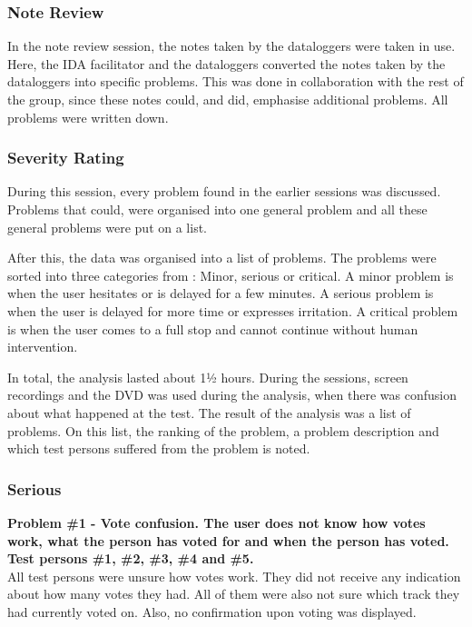 \subsubsection{Note Review}
In the note review session, the notes taken by the dataloggers were
taken in use. Here, the IDA facilitator and the dataloggers converted
the notes taken by the dataloggers into specific problems. This was
done in collaboration with the rest of the group, since these notes
could, and did, emphasise additional problems. All problems were written down.

\subsubsection{Severity Rating}
During this session, every problem found in the earlier sessions was
discussed. Problems that could, were organised into one general problem and all these general problems were put on a list.

After this, the data was organised into a list of problems. The
problems were sorted into three categories from
: Minor, serious or critical.
A minor problem is when the user hesitates or is delayed for a few
minutes. A serious problem is when the user is delayed for more time
or expresses irritation. A critical problem is when the user comes to a full stop and cannot continue without human intervention.

In total, the analysis lasted about 1½ hours. During the sessions,
screen recordings and the DVD was used during the analysis, when there
was confusion about what happened at the test. The result of the
analysis was a list of problems. On this list, the ranking of the problem, a problem description and which test persons suffered from the problem is noted.

\subsubsection{Serious}
\textbf{Problem \#1 - Vote confusion. The user does not know how votes work, what the person has voted for and when the person has voted. Test persons \#1, \#2, \#3, \#4 and \#5.}\\
All test persons were unsure how votes work. They did not receive any indication about how many votes they had. All of them were also not sure which track they had currently voted on. Also, no confirmation upon voting was displayed.\\

